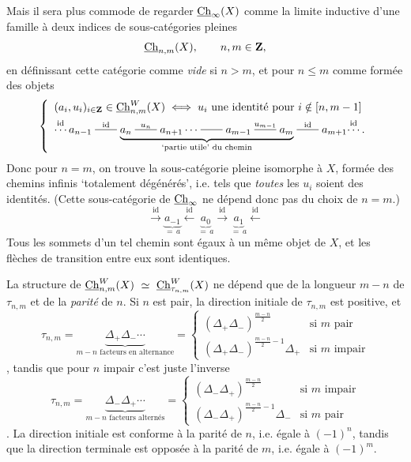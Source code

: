 Mais il sera plus commode de regarder $\underline{\mathrm{Ch}}_{\infty}(X)$ comme la limite inductive d'une
famille à deux indices de sous-catégories pleines
\[
\underline{\mathrm{Ch}}_{n,m}(X), \qquad n, m \in \mathbf{Z},
\]
en définissant cette catégorie comme \textit{vide} si $n > m$, et pour $n \leq m$ comme formée des objets
\[
\left\{ \begin{array}{l}
(a_i, u_i)_{i \in \mathbf{Z}} \in \Ch^{W}_{n,m}(X) \iff u_i \text{ une identité pour } i \notin [n, m-1] \\[1ex]
\overset{\mathrm{id}}{\cdots}\, a_{n-1} \dashto{\mathrm{id}} \underbrace{a_n \dashto{u_n} a_{n+1} \cdots \dashto{} a_{m-1} \dashto{u_{m-1}} a_m}_{\text{\scriptsize `partie utile' du chemin}} \dashto{\mathrm{id}} a_{m+1} \overset{\mathrm{id}}{\cdots}\,.
\end{array} \right.
\]
Donc pour $n = m$, on trouve la sous-catégorie pleine isomorphe à $X$, formée des chemins infinis `totalement dégénérés', i.e. tels que \textit{toutes} les $u_i$ soient des identités. (Cette sous-catégorie de $\underline{\mathrm{Ch}}_{\infty}$ ne dépend donc pas du choix de $n = m$.)
\[
\xrightarrow{\mathrm{id}} \underbrace{a_{-1}}_{=\, a} \xleftarrow{\mathrm{id}} \underbrace{a_0}_{=\, a} \xrightarrow{\mathrm{id}} \underbrace{a_1}_{=\, a} \xleftarrow{\mathrm{id}}
\]
Tous les sommets d'un tel chemin sont égaux à un même objet de $X$, et les flèches de transition entre eux sont identiques.

La structure de $\underline{\mathrm{Ch}}^{W}_{n,m}(X) \ \simeq \ \underline{\mathrm{Ch}}^{W}_{\tau_{n,m}}(X)$ ne dépend que de la longueur $m-n$ de $\tau_{n,m}$ et de la \textit{parité} de $n$. Si $n$ est pair, la direction initiale de $\tau_{n,m}$ est positive, et
\[
\tau_{n,m} = \underbrace{\Delta_+ \Delta_- \cdots}_{m-n \text{ facteurs en alternance}} = \left\{ \begin{array}{ll}
(\Delta_+ \Delta_-)^{\frac{m-n}{2}} & \text{si } m \text{ pair} \\[1ex]
(\Delta_+ \Delta_-)^{\frac{m-n}{2}-1} \Delta_+ & \text{si } m \text{ impair}
\end{array} \right.
\]
, tandis que pour $n$ impair c'est juste l'inverse
\[
\tau_{n,m} = \underbrace{\Delta_- \Delta_+ \cdots}_{m-n \text{ facteurs alternés}} = \left\{ \begin{array}{ll}
(\Delta_- \Delta_+)^{\frac{m-n}{2}} & \text{si } m \text{ impair} \\[1ex]
(\Delta_- \Delta_+)^{\frac{m-n}{2}-1} \Delta_- & \text{si } m \text{ pair}
\end{array} \right.
\]
. La direction initiale est conforme à la parité de $n$, i.e. égale à $(-1)^n$, tandis que la direction terminale est opposée à la parité de $m$, i.e. égale à $(-1)^m$.


